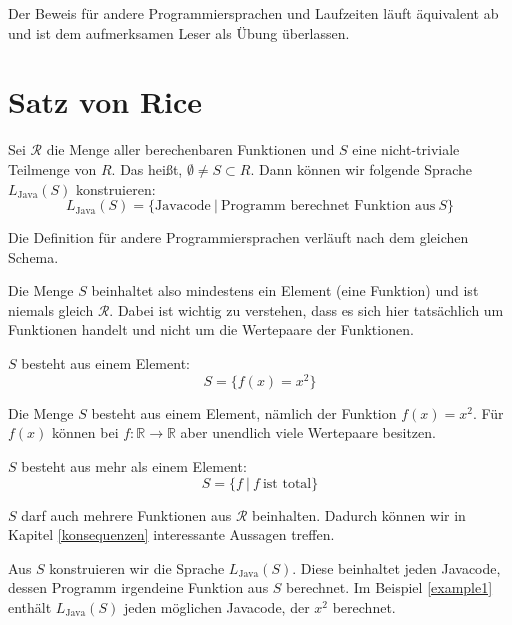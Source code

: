 \documentclass[journal]{IEEEtran}
\begin{document}
Der Beweis für andere Programmiersprachen und Laufzeiten läuft äquivalent ab und ist dem aufmerksamen Leser als Übung überlassen.

\section{Satz von Rice}
\label{satzvonrice}

\begin{definition}
\label{defls}
Sei $\mathcal{R}$ die Menge aller berechenbaren Funktionen und $S$ eine nicht-triviale Teilmenge von $R$. Das heißt, $\emptyset \ne S \subset R$. Dann können wir folgende Sprache $L_\text{Java}(S)$ konstruieren:
\begin{equation*}
L_\text{Java}(S) = \{ \text{Javacode} \ \vert \ \text{Programm berechnet Funktion aus} \ S \}
\end{equation*}
\end{definition}

Die Definition für andere Programmiersprachen verläuft nach dem gleichen Schema.

Die Menge $S$ beinhaltet also mindestens ein Element (eine Funktion) und ist niemals gleich $\mathcal{R}$. Dabei ist wichtig zu verstehen, dass es sich hier tatsächlich um Funktionen handelt und nicht um die Wertepaare der Funktionen.

\begin{example}
\label{example1}
$S$ besteht aus einem Element:
\begin{equation*}
  S = \{ f(x) = x^2 \}
\end{equation*}
\end{example}

Die Menge $S$ besteht aus einem Element, nämlich der Funktion $f(x) = x^2$. Für $f(x)$ können bei $f\colon \mathbb{R} \to \mathbb{R}$ aber unendlich viele Wertepaare besitzen.

\begin{example}
\label{example2}
$S$ besteht aus mehr als einem Element:
\begin{equation*}
  S = \{f \ \vert \ f \ \text{ist total}\}
\end{equation*}
\end{example}

$S$ darf auch mehrere Funktionen aus $\mathcal{R}$ beinhalten. Dadurch können wir in Kapitel \ref{konsequenzen} interessante Aussagen treffen.

Aus $S$ konstruieren wir die Sprache $L_\text{Java}(S)$. Diese beinhaltet jeden Javacode, dessen Programm irgendeine Funktion aus $S$ berechnet. Im Beispiel \ref{example1} enthält $L_\text{Java}(S)$ jeden möglichen Javacode, der $x^2$ berechnet.
\end{document}
